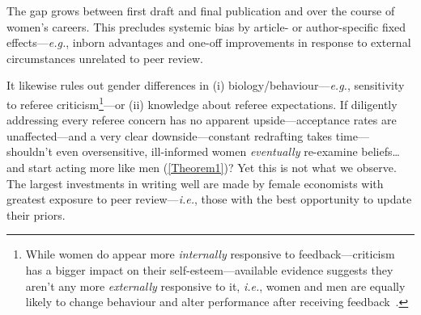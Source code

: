 The gap grows between first draft and final publication and over the course of women's careers. This precludes systemic bias by article- or author-specific fixed effects---\emph{e.g.}, inborn advantages and one-off improvements in response to external circumstances unrelated to peer review.

It likewise rules out gender differences in (i) biology\slash behaviour---\emph{e.g.}, sensitivity to referee criticism\footnote{While women do appear more \emph{internally} responsive to feedback---criticism has a bigger impact on their self-esteem---available evidence suggests they aren't any more \emph{externally} responsive to it, \emph{i.e.}, women and men are equally likely to change behaviour and alter performance after receiving feedback~\citep{Johnson2002,Roberts1989}.}---or (ii) knowledge about referee expectations. If diligently addressing every referee concern has no apparent upside---acceptance rates are unaffected---and a very clear downside---constant redrafting takes time---shouldn't even oversensitive, ill-informed women \emph{eventually} re-examine beliefs{\ldots} and start acting more like men (\autoref{Theorem1})? Yet this is not what we observe. The largest investments in writing well are made by female economists with greatest exposure to peer review---\emph{i.e.}, those with the best opportunity to update their priors.

